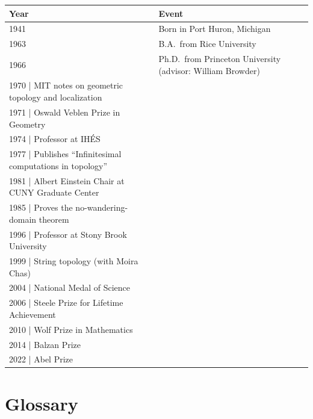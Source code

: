 \begin{tabularx}{\linewidth}{|p{1.5cm}|>{\raggedright\arraybackslash}X|}
\hline
\textbf{Year} & \textbf{Event} \\ \hline
1941 & Born in Port Huron, Michigan \\ \hline
1963 & B.A.\ from Rice University \\ \hline
1966 & Ph.D.\ from Princeton University (advisor: William Browder) \\ \hline
1970 | MIT notes on geometric topology and localization \\ \hline
1971 | Oswald Veblen Prize in Geometry \\ \hline
1974 | Professor at IH\'ES \\ \hline
1977 | Publishes ``Infinitesimal computations in topology'' \\ \hline
1981 | Albert Einstein Chair at CUNY Graduate Center \\ \hline
1985 | Proves the no-wandering-domain theorem \\ \hline
1996 | Professor at Stony Brook University \\ \hline
1999 | String topology (with Moira Chas) \\ \hline
2004 | National Medal of Science \\ \hline
2006 | Steele Prize for Lifetime Achievement \\ \hline
2010 | Wolf Prize in Mathematics \\ \hline
2014 | Balzan Prize \\ \hline
2022 | Abel Prize \\ \hline
\end{tabularx}

\section*{Glossary}

